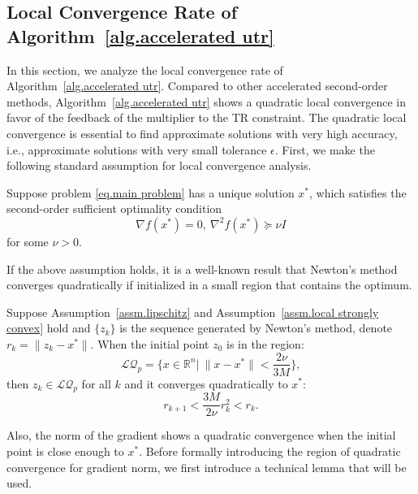 \documentclass{mcom-l}
\numberwithin{equation}{section}
\begin{document}
\subsection{Local Convergence Rate of Algorithm~\ref{alg.accelerated utr}}
\label{sec.local}
In this section, we analyze the local convergence rate of Algorithm~\ref{alg.accelerated utr}. Compared to other accelerated second-order methods, Algorithm~\ref{alg.accelerated utr} shows a quadratic local convergence in favor of the feedback of the multiplier to the TR constraint. The quadratic local convergence is essential to find approximate solutions with very high accuracy, i.e., approximate solutions with very small tolerance $\epsilon$. First, we make the following standard assumption for local convergence analysis.
\begin{assumption}
    \label{assm.local strongly convex}
    Suppose problem \eqref{eq.main problem} has a unique solution $x^*$, which satisfies the second-order sufficient optimality condition
    \begin{equation}
        \label{eq.second-order suff cond}
        \nabla f(x^*)=0, \ \nabla^2 f(x^*)\succeq \nu I
    \end{equation}
    for some $\nu >0$.
\end{assumption}
If the above assumption holds, it is a well-known result that Newton's method converges quadratically if initialized in a small region that contains the optimum.
\begin{lemma}
    \label{lem.quadratic point}
    Suppose Assumption~\ref{assm.lipschitz} and Assumption~\ref{assm.local strongly convex} hold and $\{z_k\}$ is the sequence generated by Newton's method, denote $r_k = \|z_k-x^*\|$. When the initial point $z_0$ is in the region:
    \begin{equation}
        \label{eq.local quadratic region}
        \mathcal{LQ}_p = \{x\in\mathbb{R}^n| \ \|x-x^*\| < \frac{2\nu}{3M}\},
    \end{equation}
    then $z_k \in \mathcal{LQ}_p$ for all $k$ and it converges quadratically to $x^*$:
    \begin{equation}
        \label{eq.quadratic convergence}
        r_{k+1} < \frac{3M}{2\nu}r_k^2<r_k.
    \end{equation}
\end{lemma}
Also, the norm of the gradient shows a quadratic convergence when the initial point is close enough to $x^*$. Before formally introducing the region of quadratic convergence for gradient norm, we first introduce a technical lemma that will be used.
\end{document}
